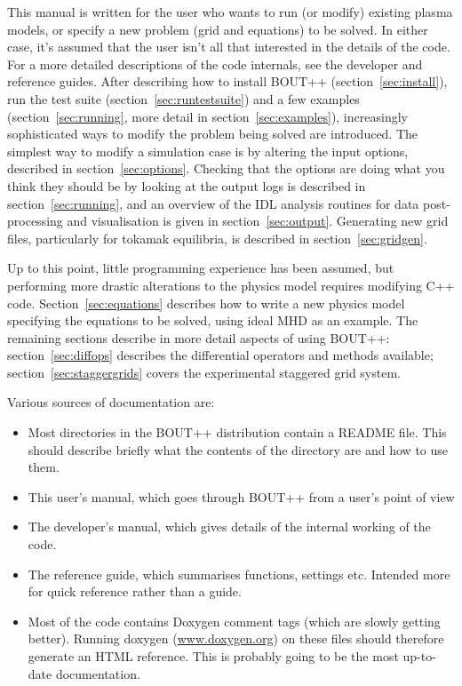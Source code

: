 \documentclass[12pt]{article}
\begin{document}
This manual is written for the user who wants to run (or modify) existing plasma models, or
specify a new problem (grid and equations) to be solved. In either case, it's assumed that
the user isn't all that interested in the details of the code.
For a more detailed descriptions of the code internals, see the developer
and reference guides.
After describing how to install BOUT++ (section~\ref{sec:install}), run the test suite
(section~\ref{sec:runtestsuite}) and a few examples
(section~\ref{sec:running}, more detail in section~\ref{sec:examples}), increasingly sophisticated ways to modify the problem being solved are introduced.
The simplest way to modify a simulation case is by altering the input options, described in
section~\ref{sec:options}. Checking that the options are doing what you think they should be
by looking at the output logs is described in section~\ref{sec:running}, and an overview of the IDL analysis routines
for data post-processing and visualisation is given in section~\ref{sec:output}.
Generating new grid files, particularly for tokamak equilibria, is described in section~\ref{sec:gridgen}.

Up to this point, little programming experience has been assumed, but performing more drastic
alterations to the physics model requires modifying C++ code.
Section~\ref{sec:equations} describes how to write a new physics model specifying the equations to be solved,
using ideal MHD as an example. The remaining sections describe in more detail aspects of using BOUT++:
section~\ref{sec:diffops} describes the differential operators and methods available; section~\ref{sec:staggergrids}
covers the experimental staggered grid system.

Various sources of documentation are:
\begin{itemize}
\item Most directories in the BOUT++ distribution contain a README file. This should
describe briefly what the contents of the directory are and how to use them.
\item This user's manual, which goes through BOUT++ from a user's point of view
\item The developer's manual, which gives details of the internal working of the code.
\item The reference guide, which summarises functions, settings etc. Intended more for
quick reference rather than a guide.
\item Most of the code contains Doxygen comment tags (which are slowly getting better).
Running doxygen (\url{www.doxygen.org}) on these files should therefore generate an HTML
reference. This is probably going to be the most up-to-date documentation.
\end{itemize}
\end{document}
